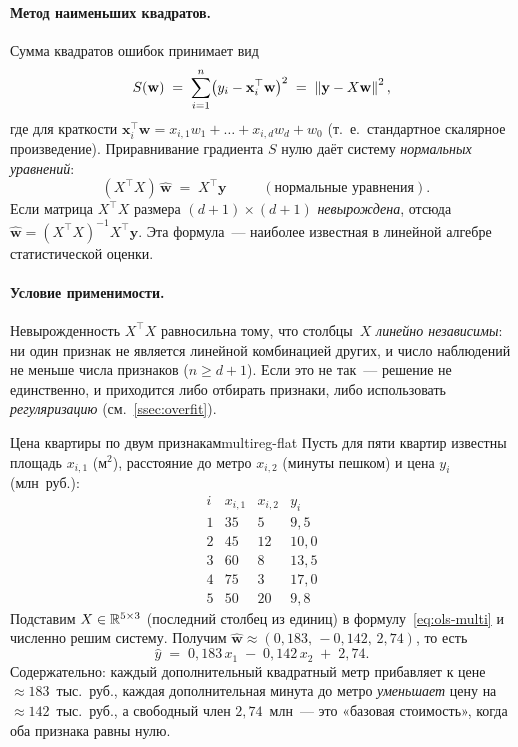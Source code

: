 \paragraph{Метод наименьших квадратов.}
Сумма квадратов ошибок принимает вид
\[
S(\mathbf w)\;=\;\sum_{i=1}^{n}\bigl(y_i-\mathbf x_i^{\top}\mathbf w\bigr)^{2}
\;=\;\left\|\mathbf y-X\mathbf w\right\|^{2},
\]
где для краткости $\mathbf x_i^{\top}\mathbf w=x_{i,1}w_1+\dots+x_{i,d}w_d+w_0$
(т.~е.\ стандартное скалярное произведение). Приравнивание градиента
$S$ нулю даёт систему \emph{нормальных уравнений}:
\begin{equation}\label{eq:ols-multi}
\boxed{\;\;(X^{\top}X)\,\hat{\mathbf w}\;=\;X^{\top}\mathbf y\;\;}\qquad(\text{нормальные уравнения}).
\end{equation}
Если матрица $X^{\top}X$ размера $(d+1)\times(d+1)$ \emph{невырождена},
отсюда $\hat{\mathbf w}=(X^{\top}X)^{-1}X^{\top}\mathbf y$. Эта формула~---
наиболее известная в линейной алгебре статистической оценки.

\paragraph{Условие применимости.}
Невырожденность $X^{\top}X$ равносильна тому, что столбцы~$X$ \emph{линейно
независимы}: ни один признак не является линейной комбинацией других, и
число наблюдений не меньше числа признаков ($n\geq d+1$). Если это не
так~--- решение не единственно, и приходится либо отбирать признаки,
либо использовать \emph{регуляризацию} (см.\ \cref{ssec:overfit}).

\begin{example}{Цена квартиры по двум признакам}{multireg-flat}
Пусть для пяти квартир известны площадь $x_{i,1}$ (м$^{2}$), расстояние
до метро $x_{i,2}$ (минуты пешком) и цена $y_i$ (млн~руб.):
\[
\begin{array}{c|c|c|c}
i & x_{i,1} & x_{i,2} & y_i \\ \hline
1 & 35 & 5 & 9{,}5 \\
2 & 45 & 12 & 10{,}0 \\
3 & 60 & 8  & 13{,}5 \\
4 & 75 & 3  & 17{,}0 \\
5 & 50 & 20 & 9{,}8
\end{array}
\]
Подставим $X\in\mathbb{R}^{5\times 3}$ (последний столбец из единиц) в
формулу~\eqref{eq:ols-multi} и численно решим систему. Получим
$\hat{\mathbf w}\approx(0{,}183,\,-0{,}142,\,2{,}74)$, то есть
\[
\hat y\;=\;0{,}183\,x_{1}\;-\;0{,}142\,x_{2}\;+\;2{,}74.
\]
Содержательно: каждый дополнительный квадратный метр прибавляет к цене
$\approx\!183$~тыс.\ руб., каждая дополнительная минута до метро
\emph{уменьшает} цену на $\approx\!142$~тыс.\ руб., а свободный член
$2{,}74$~млн~--- это «базовая стоимость», когда оба признака равны
нулю.
\end{example}

